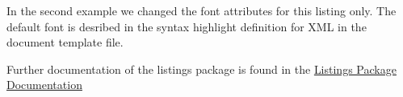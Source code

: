 \lstset{language=XML,
	   includerangemarker=false,
	   rangebeginprefix=<,
	   rangeendprefix=</,
	   rangesuffix=>}
	   


In the second example we changed the font attributes for this listing only. The default font is desribed in the syntax highlight definition for XML in the document template file. 

Further documentation of the listings package is found in the \href{http://mirror.jmu.edu/pub/CTAN/macros/latex/contrib/listings/listings.pdf}{Listings Package Documentation}
